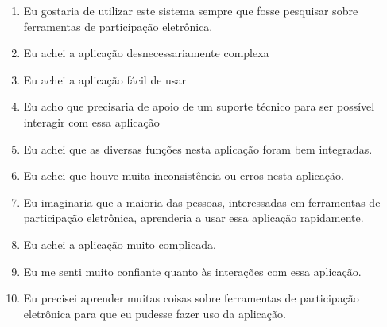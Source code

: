 \begin{enumerate}
    \item Eu gostaria de utilizar este sistema sempre que fosse pesquisar sobre ferramentas de participação eletrônica.
    \item Eu achei a aplicação desnecessariamente complexa
    \item Eu achei a aplicação fácil de usar
    \item Eu acho que precisaria de apoio de um suporte técnico para ser possível interagir com essa aplicação
    \item Eu achei que as diversas funções nesta aplicação foram bem integradas.
    \item Eu achei que houve muita inconsistência ou erros nesta aplicação.
    \item Eu imaginaria que a maioria das pessoas, interessadas em ferramentas de participação eletrônica, aprenderia a usar essa aplicação rapidamente.
    \item Eu achei a aplicação muito complicada.
    \item Eu me senti muito confiante quanto às interações com essa aplicação.
    \item Eu precisei aprender muitas coisas sobre ferramentas de participação eletrônica para que eu pudesse fazer uso da aplicação.
\end{enumerate}